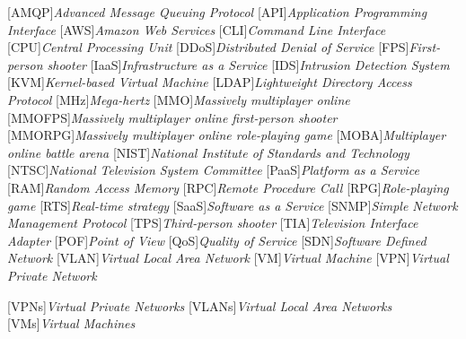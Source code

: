 \begin{acronym}[]
	[AMQP]{{\it Advanced Message Queuing Protocol}}
	[API]{{\it Application Programming Interface}}
  [AWS]{{\it Amazon Web Services}}
	[CLI]{{\it Command Line Interface}}
	[CPU]{{\it Central Processing Unit}}
	[DDoS]{{\it Distributed Denial of Service}}
	[FPS]{{\it First-person shooter}}
	[IaaS]{{\it Infrastructure as a Service}}
  [IDS]{{\it Intrusion Detection System}}
	[KVM]{{\it Kernel-based Virtual Machine}}
  [LDAP]{{\it Lightweight Directory Access Protocol}}
	[MHz]{{\it Mega-hertz}}
	[MMO]{{\it Massively multiplayer online}}
	[MMOFPS]{{\it Massively multiplayer online first-person shooter}}
	[MMORPG]{{\it Massively multiplayer online role-playing game}}
	[MOBA]{{\it Multiplayer online battle arena}}
	[NIST]{{\it National Institute of Standards and Technology}}
	[NTSC]{{\it National Television System Committee}}
	[PaaS]{{\it Platform as a Service}}
	[RAM]{{\it Random Access Memory}}
  [RPC]{{\it Remote Procedure Call}}
	[RPG]{{\it Role-playing game}}
	[RTS]{{\it Real-time strategy}}
	[SaaS]{{\it Software as a Service}}
	[SNMP]{{\it Simple Network Management Protocol}}
	[TPS]{{\it Third-person shooter}}
	[TIA]{{\it Television Interface Adapter}}
	[POF]{{\it Point of View}}
	[QoS]{{\it Quality of Service}}
	[SDN]{{\it Software Defined Network}}
	[VLAN]{{\it Virtual Local Area Network}}
	[VM]{{\it Virtual Machine}}
	[VPN]{{\it Virtual Private Network}}



	[VPNs]{{\it Virtual Private Networks}}
	[VLANs]{{\it Virtual Local Area Networks}}
	[VMs]{{\it Virtual Machines}}
\end{acronym}

